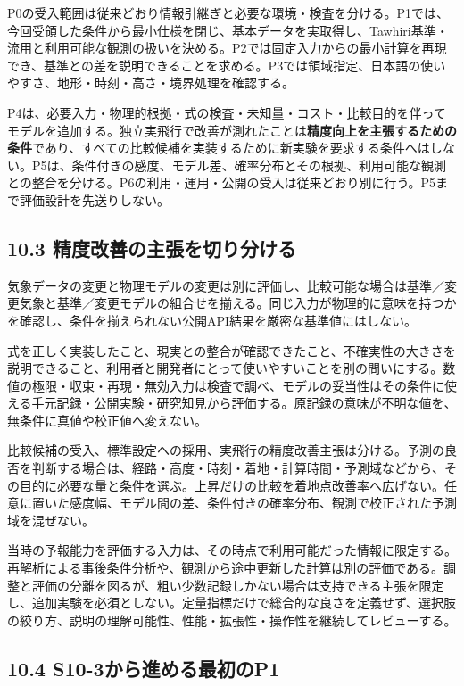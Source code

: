 \documentclass[11pt,a4paper]{article}
\begin{document}
P0の受入範囲は従来どおり情報引継ぎと必要な環境・検査を分ける。P1では、今回受領した条件から最小仕様を閉じ、基本データを実取得し、Tawhiri基準・流用と利用可能な観測の扱いを決める。P2では固定入力からの最小計算を再現でき、基準との差を説明できることを求める。P3では領域指定、日本語の使いやすさ、地形・時刻・高さ・境界処理を確認する。

P4は、必要入力・物理的根拠・式の検査・未知量・コスト・比較目的を伴ってモデルを追加する。独立実飛行で改善が測れたことは\textbf{精度向上を主張するための条件}であり、すべての比較候補を実装するために新実験を要求する条件へはしない。P5は、条件付きの感度、モデル差、確率分布とその根拠、利用可能な観測との整合を分ける。P6の利用・運用・公開の受入は従来どおり別に行う。P5まで評価設計を先送りしない。

\subsection{10.3
精度改善の主張を切り分ける}\label{ux7cbeux5ea6ux6539ux5584ux306eux4e3bux5f35ux3092ux5207ux308aux5206ux3051ux308b}

気象データの変更と物理モデルの変更は別に評価し、比較可能な場合は基準／変更気象と基準／変更モデルの組合せを揃える。同じ入力が物理的に意味を持つかを確認し、条件を揃えられない公開API結果を厳密な基準値にはしない。

式を正しく実装したこと、現実との整合が確認できたこと、不確実性の大きさを説明できること、利用者と開発者にとって使いやすいことを別の問いにする。数値の極限・収束・再現・無効入力は検査で調べ、モデルの妥当性はその条件に使える手元記録・公開実験・研究知見から評価する。原記録の意味が不明な値を、無条件に真値や校正値へ変えない。

比較候補の受入、標準設定への採用、実飛行の精度改善主張は分ける。予測の良否を判断する場合は、経路・高度・時刻・着地・計算時間・予測域などから、その目的に必要な量と条件を選ぶ。上昇だけの比較を着地点改善率へ広げない。任意に置いた感度幅、モデル間の差、条件付きの確率分布、観測で校正された予測域を混ぜない。

当時の予報能力を評価する入力は、その時点で利用可能だった情報に限定する。再解析による事後条件分析や、観測から途中更新した計算は別の評価である。調整と評価の分離を図るが、粗い少数記録しかない場合は支持できる主張を限定し、追加実験を必須としない。定量指標だけで総合的な良さを定義せず、選択肢の絞り方、説明の理解可能性、性能・拡張性・操作性を継続してレビューする。

\subsection{10.4
S10-3から進める最初のP1}\label{s10-3ux304bux3089ux9032ux3081ux308bux6700ux521dux306ep1}
\end{document}

